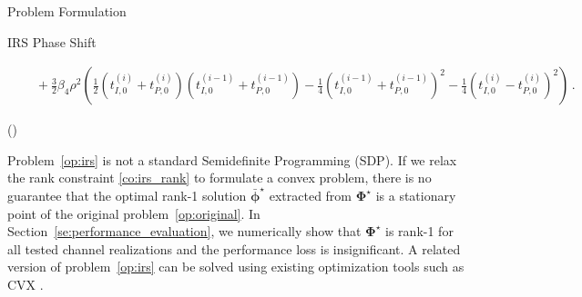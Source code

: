 \documentclass[journal]{IEEEtran}
\begin{document}
\begin{section}{Problem Formulation}
\begin{subsection}{IRS Phase Shift}
\begin{figure*}[b]
\begin{align}
					& \quad + \frac{3}{2}{\beta_4}{\rho^2} \left(\frac{1}{2}(t_{I,0}^{(i)} + t_{P,0}^{(i)})(t_{I,0}^{(i-1)} + t_{P,0}^{(i-1)}) - \frac{1}{4}(t_{I,0}^{(i-1)} + t_{P,0}^{(i-1)})^2 - \frac{1}{4}(t_{I,0}^{(i)} - t_{P,0}^{(i)})^2\right)\,.\label{eq:z_irs_approx}
				\end{align}
			\end{figure*}
			\begin{maxi!}
				{\boldsymbol{\Phi}}{(\boldsymbol{\Phi})}{\label{op:irs}}{\label{ob:irs}}
				\label{co:irs_rate}
				\label{co:irs_modulus}
			\end{maxi!}
			Problem~\ref{op:irs} is not a standard Semidefinite Programming (SDP). If we relax the rank constraint \ref{co:irs_rank} to formulate a convex problem, there is no guarantee that the optimal rank-\num{1} solution $\bar{\boldsymbol{\phi}}^{\star}$ extracted from $\boldsymbol{\Phi}^{\star}$ is a stationary point of the original problem~\ref{op:original}. In Section~\ref{se:performance_evaluation}, we numerically show that $\boldsymbol{\Phi}^{\star}$ is rank-\num{1} for all tested channel realizations and the performance loss is insignificant. A related version of problem~\ref{op:irs} can be solved using existing optimization tools such as CVX \cite{Grant2013}.


\end{subsection}
\end{section}
\end{document}
